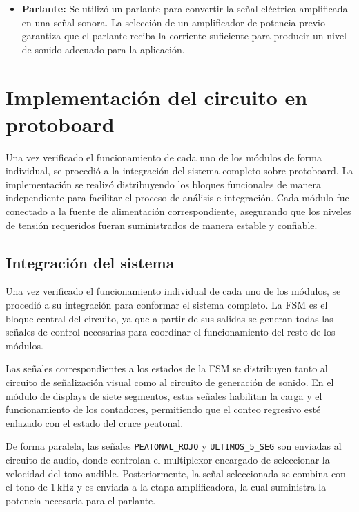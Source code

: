 \documentclass[12pt, journal, onecolumn]{IEEEtran}
\begin{document}
\begin{itemize}
    \item \textbf{Parlante:} Se utilizó un parlante para convertir la señal eléctrica amplificada en una señal sonora. La selección de un amplificador de potencia previo garantiza que el parlante reciba la corriente suficiente para producir un nivel de sonido adecuado para la aplicación.\\
\end{itemize}

\newpage
	
\section{Implementación del circuito en protoboard}

Una vez verificado el funcionamiento de cada uno de los módulos de forma individual, se procedió a la integración del sistema completo sobre protoboard. La implementación se realizó distribuyendo los bloques funcionales de manera independiente para facilitar el proceso de análisis e integración. Cada módulo fue conectado a la fuente de alimentación correspondiente, asegurando que los niveles de tensión requeridos fueran suministrados de manera estable y confiable.

\subsection{Integración del sistema}

Una vez verificado el funcionamiento individual de cada uno de los módulos, se procedió a su integración para conformar el sistema completo. La FSM es el bloque central del circuito, ya que a partir de sus salidas se generan todas las señales de control necesarias para coordinar el funcionamiento del resto de los módulos.

Las señales correspondientes a los estados de la FSM se distribuyen tanto al circuito de señalización visual como al circuito de generación de sonido. En el módulo de displays de siete segmentos, estas señales habilitan la carga y el funcionamiento de los contadores, permitiendo que el conteo regresivo esté enlazado con el estado del cruce peatonal.

De forma paralela, las señales \texttt{PEATONAL\_ROJO} y \texttt{ULTIMOS\_5\_SEG} son enviadas al circuito de audio, donde controlan el multiplexor encargado de seleccionar la velocidad del tono audible. Posteriormente, la señal seleccionada se combina con el tono de $1\,\mathrm{kHz}$ y es enviada a la etapa amplificadora, la cual suministra la potencia necesaria para el parlante.
\end{document}
